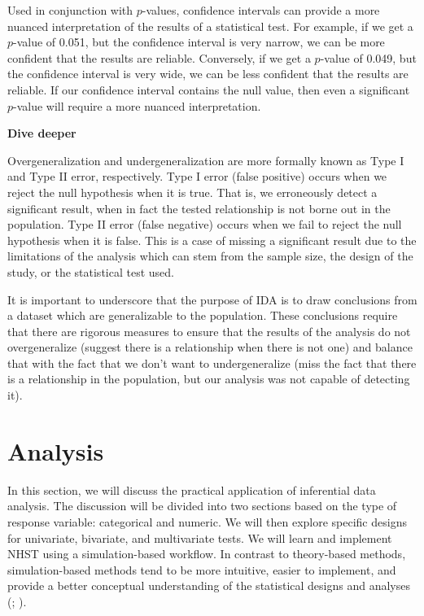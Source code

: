 \documentclass[
  letterpaper,
  krantz1]{latex/krantz-mod}
\theoremstyle{definition}
\theoremstyle{definition}
\theoremstyle{remark}
\begin{document}
Used in conjunction with \(p\)-values, confidence
intervals can provide a more nuanced
interpretation of the results of a statistical test. For example, if we
get a \(p\)-value of 0.051, but the confidence interval is very narrow,
we can be more confident that the results are reliable. Conversely, if
we get a \(p\)-value of 0.049, but the confidence interval is very wide,
we can be less confident that the results are reliable. If our
confidence interval contains the null value, then even a significant
\(p\)-value will require a more nuanced
interpretation.

\begin{tcolorbox}[enhanced jigsaw, toprule=.15mm, breakable, colback=white, arc=.35mm, left=2mm, colframe=quarto-callout-color-frame, opacityback=0, bottomrule=.15mm, rightrule=.15mm, leftrule=.75mm]

\textbf{ Dive deeper}

Overgeneralization and undergeneralization are more formally known as
Type I and Type II error, respectively. Type I error (false positive)
occurs when we reject the null hypothesis when it is true. That is, we
erroneously detect a significant result, when in fact the tested
relationship is not borne out in the population. Type II error (false
negative) occurs when we fail to reject the null hypothesis when it is
false. This is a case of missing a significant result due to the
limitations of the analysis which can stem from the sample size, the
design of the study, or the statistical test used.

\end{tcolorbox}

It is important to underscore that the purpose of IDA is to draw
conclusions from a dataset which are generalizable to the population.
These conclusions require that there are rigorous measures to ensure
that the results of the analysis do not overgeneralize (suggest there is
a relationship when there is not one) and balance that with the fact
that we don't want to undergeneralize (miss the fact that there is a
relationship in the population, but our analysis was not capable of
detecting it).

\section{Analysis}\label{sec-infer-analysis}

In this section, we will discuss the practical application of
inferential data analysis. The discussion will be divided into two
sections based on the type of response variable: categorical and
numeric. We will then explore specific designs for univariate,
bivariate, and multivariate tests. We will
learn and implement
NHST using a
simulation-based workflow. In contrast to theory-based methods,
simulation-based methods tend to be more intuitive, easier to implement,
and provide a better conceptual understanding of the statistical designs
and analyses (; ).
\end{document}
